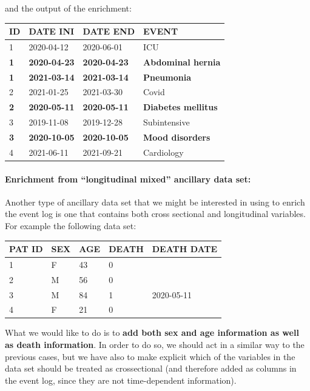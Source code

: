 \documentclass[
]{book}
\begin{document}
and the output of the enrichment:

\begin{longtable}[]{@{}llll@{}}
\toprule
ID & DATE INI & DATE END & EVENT \\
\midrule
\endhead
1 & 2020-04-12 & 2020-06-01 & ICU \\
\textbf{1} & \textbf{2020-04-23} & \textbf{2020-04-23} & \textbf{Abdominal hernia} \\
\textbf{1} & \textbf{2021-03-14} & \textbf{2021-03-14} & \textbf{Pneumonia} \\
2 & 2021-01-25 & 2021-03-30 & Covid \\
\textbf{2} & \textbf{2020-05-11} & \textbf{2020-05-11} & \textbf{Diabetes mellitus} \\
3 & 2019-11-08 & 2019-12-28 & Subintensive \\
\textbf{3} & \textbf{2020-10-05} & \textbf{2020-10-05} & \textbf{Mood disorders} \\
4 & 2021-06-11 & 2021-09-21 & Cardiology \\
\bottomrule
\end{longtable}

\hypertarget{enrichment-from-longitudinal-mixed-ancillary-data-set}{%
\paragraph{Enrichment from ``longitudinal mixed'' ancillary data set:}\label{enrichment-from-longitudinal-mixed-ancillary-data-set}}

Another type of ancillary data set that we might be interested in using to enrich the event log is one that contains both cross sectional and longitudinal variables. For example the following data set:

\begin{longtable}[]{@{}lllll@{}}
\toprule
PAT ID & SEX & AGE & DEATH & DEATH DATE \\
\midrule
\endhead
1 & F & 43 & 0 & \\
2 & M & 56 & 0 & \\
3 & M & 84 & 1 & 2020-05-11 \\
4 & F & 21 & 0 & \\
\bottomrule
\end{longtable}

What we would like to do is to \textbf{add both sex and age information as well as death information}. In order to do so, we should act in a similar way to the previous cases, but we have also to make explicit which of the variables in the data set should be treated as crossectional (and therefore added as columns in the event log, since they are not time-dependent information).
\end{document}
